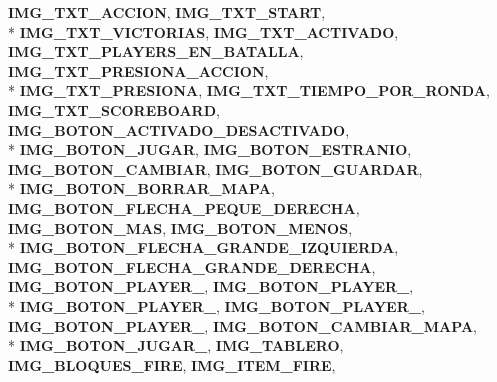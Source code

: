 \begin{DoxyCompactItemize}
{\bfseries I\+M\+G\+\_\+\+T\+X\+T\+\_\+\+A\+C\+C\+I\+ON}, 
{\bfseries I\+M\+G\+\_\+\+T\+X\+T\+\_\+\+S\+T\+A\+RT}, 
\\*
{\bfseries I\+M\+G\+\_\+\+T\+X\+T\+\_\+\+V\+I\+C\+T\+O\+R\+I\+AS}, 
{\bfseries I\+M\+G\+\_\+\+T\+X\+T\+\_\+\+A\+C\+T\+I\+V\+A\+DO}, 
{\bfseries I\+M\+G\+\_\+\+T\+X\+T\+\_\+\+P\+L\+A\+Y\+E\+R\+S\+\_\+\+E\+N\+\_\+\+B\+A\+T\+A\+L\+LA}, 
{\bfseries I\+M\+G\+\_\+\+T\+X\+T\+\_\+\+P\+R\+E\+S\+I\+O\+N\+A\+\_\+\+A\+C\+C\+I\+ON}, 
\\*
{\bfseries I\+M\+G\+\_\+\+T\+X\+T\+\_\+\+P\+R\+E\+S\+I\+O\+NA}, 
{\bfseries I\+M\+G\+\_\+\+T\+X\+T\+\_\+\+T\+I\+E\+M\+P\+O\+\_\+\+P\+O\+R\+\_\+\+R\+O\+N\+DA}, 
{\bfseries I\+M\+G\+\_\+\+T\+X\+T\+\_\+\+S\+C\+O\+R\+E\+B\+O\+A\+RD}, 
{\bfseries I\+M\+G\+\_\+\+B\+O\+T\+O\+N\+\_\+\+A\+C\+T\+I\+V\+A\+D\+O\+\_\+\+D\+E\+S\+A\+C\+T\+I\+V\+A\+DO}, 
\\*
{\bfseries I\+M\+G\+\_\+\+B\+O\+T\+O\+N\+\_\+\+J\+U\+G\+AR}, 
{\bfseries I\+M\+G\+\_\+\+B\+O\+T\+O\+N\+\_\+\+E\+S\+T\+R\+A\+N\+IO}, 
{\bfseries I\+M\+G\+\_\+\+B\+O\+T\+O\+N\+\_\+\+C\+A\+M\+B\+I\+AR}, 
{\bfseries I\+M\+G\+\_\+\+B\+O\+T\+O\+N\+\_\+\+G\+U\+A\+R\+D\+AR}, 
\\*
{\bfseries I\+M\+G\+\_\+\+B\+O\+T\+O\+N\+\_\+\+B\+O\+R\+R\+A\+R\+\_\+\+M\+A\+PA}, 
{\bfseries I\+M\+G\+\_\+\+B\+O\+T\+O\+N\+\_\+\+F\+L\+E\+C\+H\+A\+\_\+\+P\+E\+Q\+U\+E\+\_\+\+D\+E\+R\+E\+C\+HA}, 
{\bfseries I\+M\+G\+\_\+\+B\+O\+T\+O\+N\+\_\+\+M\+AS}, 
{\bfseries I\+M\+G\+\_\+\+B\+O\+T\+O\+N\+\_\+\+M\+E\+N\+OS}, 
\\*
{\bfseries I\+M\+G\+\_\+\+B\+O\+T\+O\+N\+\_\+\+F\+L\+E\+C\+H\+A\+\_\+\+G\+R\+A\+N\+D\+E\+\_\+\+I\+Z\+Q\+U\+I\+E\+R\+DA}, 
{\bfseries I\+M\+G\+\_\+\+B\+O\+T\+O\+N\+\_\+\+F\+L\+E\+C\+H\+A\+\_\+\+G\+R\+A\+N\+D\+E\+\_\+\+D\+E\+R\+E\+C\+HA}, 
{\bfseries I\+M\+G\+\_\+\+B\+O\+T\+O\+N\+\_\+\+P\+L\+A\+Y\+E\+R\+\_}, 
{\bfseries I\+M\+G\+\_\+\+B\+O\+T\+O\+N\+\_\+\+P\+L\+A\+Y\+E\+R\+\_}, 
\\*
{\bfseries I\+M\+G\+\_\+\+B\+O\+T\+O\+N\+\_\+\+P\+L\+A\+Y\+E\+R\+\_}, 
{\bfseries I\+M\+G\+\_\+\+B\+O\+T\+O\+N\+\_\+\+P\+L\+A\+Y\+E\+R\+\_}, 
{\bfseries I\+M\+G\+\_\+\+B\+O\+T\+O\+N\+\_\+\+P\+L\+A\+Y\+E\+R\+\_}, 
{\bfseries I\+M\+G\+\_\+\+B\+O\+T\+O\+N\+\_\+\+C\+A\+M\+B\+I\+A\+R\+\_\+\+M\+A\+PA}, 
\\*
{\bfseries I\+M\+G\+\_\+\+B\+O\+T\+O\+N\+\_\+\+J\+U\+G\+A\+R\+\_}, 
{\bfseries I\+M\+G\+\_\+\+T\+A\+B\+L\+E\+RO}, 
{\bfseries I\+M\+G\+\_\+\+B\+L\+O\+Q\+U\+E\+S\+\_\+\+F\+I\+RE}, 
{\bfseries I\+M\+G\+\_\+\+I\+T\+E\+M\+\_\+\+F\+I\+RE}, 

\end{DoxyCompactItemize}
